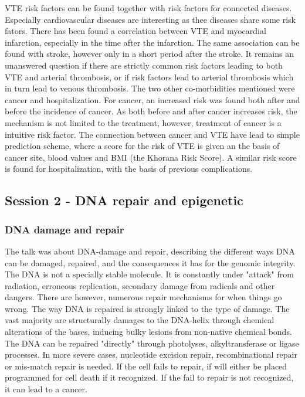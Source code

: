 \documentclass[12p]{article}
\begin{document}
VTE risk factors can be found together with risk factors for connected diseases.
Especially cardiovascular diseases are interesting as thee diseases share some risk fators.
There has been found a correlation between VTE and myocardial infarction, especially in the time after the infarction.
The same association can be found with stroke, however only in a short period after the stroke.
It remains an unanswered question if there are strictly common risk factors leading to both VTE and arterial thrombosis, or if risk factors lead to arterial thrombosis which in turn lead to venous thrombosis.
The two other co-morbidities mentioned were cancer and hospitalization.
For cancer, an increased risk was found both after and before the incidence of cancer.
As both before and after cancer increases risk, the mechanism is not limited to the treatment, however, treatment of cancer is a intuitive risk factor.
The connection between cancer and VTE have lead to simple prediction scheme, where a score for the risk of VTE is given an the basis of cancer site, blood values and BMI (the Khorana Risk Score).
A similar risk score is found for hospitalization, with the basis of previous complications.

\subsection*{Session 2 - DNA repair and epigenetic}

\subsubsection*{DNA damage and repair}

The talk was about DNA-damage and repair, describing the different ways DNA can be damaged, repaired, and the consequences it has for the genomic integrity.
The DNA is not a specially stable molecule.
It is constantly under "attack" from radiation, erroneous replication, secondary damage from radicals and other dangers.
There are however, numerous repair mechanisms for when things go wrong.
The way DNA is repaired is strongly linked to the type of damage.
The vast majority are structurally damages to the DNA-helix through chemical alterations of the bases, inducing bulky lesions from non-native chemical bonds.
The DNA can be repaired "directly" through photolyses, alkyltransferase or ligase processes.
In more severe cases, nucleotide excision repair, recombinational repair or mis-match repair is needed.
If the cell fails to repair, if will either be placed programmed for cell death if it recognized.
If the fail to repair is not recognized, it can lead to a cancer.
\end{document}
